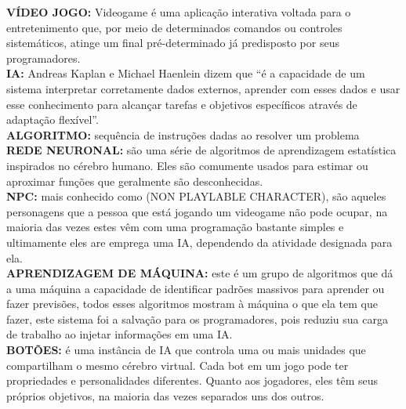 \documentclass[a4paper]{report}
\begin{document}
\textbf{VÍDEO JOGO:} Videogame é uma aplicação interativa voltada para o entretenimento que, por meio de determinados comandos ou controles sistemáticos, atinge um final pré-determinado já predisposto por seus programadores.\\

\textbf{\ac{IA}:} Andreas Kaplan e Michael Haenlein dizem que “é a capacidade de um sistema interpretar corretamente dados externos, aprender com esses dados e usar esse conhecimento para alcançar tarefas e objetivos específicos através de adaptação flexível”.\\

\textbf{ALGORITMO:} sequência de instruções dadas ao resolver um problema\\

\textbf{REDE NEURONAL:} são uma série de algoritmos de aprendizagem estatística inspirados no cérebro humano. Eles são comumente usados para estimar ou aproximar funções que geralmente são desconhecidas.\\

\textbf{NPC:} mais conhecido como (NON PLAYLABLE CHARACTER), são aqueles personagens que a pessoa que está jogando um videogame não pode ocupar, na maioria das vezes estes vêm com uma programação bastante simples e ultimamente eles are emprega uma \ac{IA}, dependendo da atividade designada para ela.\\

\textbf{APRENDIZAGEM DE MÁQUINA:} este é um grupo de algoritmos que dá a uma máquina a capacidade de identificar padrões massivos para aprender ou fazer previsões, todos esses algoritmos mostram à máquina o que ela tem que fazer, este sistema foi a salvação para os programadores, pois reduziu sua carga de trabalho ao injetar informações em uma \ac{IA}.\\

\textbf{BOTÕES:} é uma instância de \ac{IA} que controla uma ou mais unidades que compartilham o mesmo cérebro virtual. Cada bot em um jogo pode ter propriedades e personalidades diferentes. Quanto aos jogadores, eles têm seus próprios objetivos, na maioria das vezes separados uns dos outros.

\end{document}
